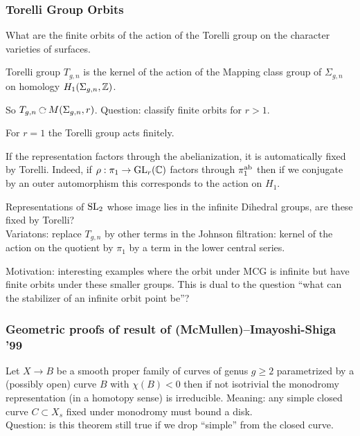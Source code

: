 \documentclass[12pt]{article}
\begin{document}
\subsubsection{Torelli Group Orbits}

What are the finite orbits of the action of the Torelli group on the character varieties of surfaces. 

\begin{defn}
Torelli group $T_{g,n}$ is the kernel of the action of the Mapping class group of $\Sigma_{g,n}$ on homology $H_1(\Sigma_{g,n}, \mathbb{Z})$.
\end{defn}

So $T_{g,n} \acts M(\Sigma_{g,n}, r)$. Question: classify finite orbits for $r > 1$.

\begin{rmk}
For $r = 1$ the Torelli group acts finitely. 
\end{rmk}

\begin{rmk}
If the representation factors through the abelianization, it is automatically fixed by Torelli. Indeed, if $\rho : \pi_1 \to \mathrm{GL}_r(\mathbb{C})$ factors through $\pi_1^{\mathrm{ab}}$ then if we conjugate by an outer automorphism this corresponds to the action on $H_1$. 
\end{rmk}

Representations of $\mathrm{SL}_2$ whose image lies in the infinite Dihedral groups, are these fixed by Torelli? 
\\
Variatons: replace $T_{g,n}$ by other terms in the Johnson filtration: kernel of the action on the quotient by $\pi_1$ by a term in the lower central series. 

Motivation: interesting examples where the orbit under MCG is infinite but have finite orbits under these smaller groups. This is dual to the question ``what can the stabilizer of an infinite orbit point be''? 

\subsubsection{Geometric proofs of result of (McMullen)--Imayoshi-Shiga '99}

Let $X \to B$ be a smooth proper family of curves of genus $g \ge 2$ parametrized by a (possibly open) curve $B$ with $\chi(B) < 0$ then if not isotrivial the monodromy representation (in a homotopy sense) is irreducible. Meaning: any simple closed curve $C \subset X_s$ fixed under monodromy must bound a disk.  
\\
Question: is this theorem still true if we drop ``simple'' from the closed curve. 
\end{document}
